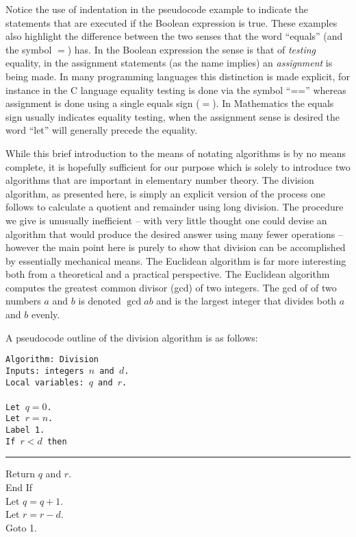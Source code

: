 Notice the use of indentation in the pseudocode example to indicate
the statements that are executed if the Boolean expression is true.
These examples also highlight the difference between the two senses 
that the word ``equals'' (and the symbol $=$) has.  In the Boolean
expression the sense is that of {\em testing} equality, in the
assignment statements (as the name implies) an {\em assignment} is
being made.  In many programming languages this distinction is made
explicit, for instance in the C language equality testing is done via
the symbol ``=='' whereas assignment is done using a single equals
sign ($=$).  In Mathematics the equals sign usually indicates equality
testing, when the assignment sense is desired the word ``let'' will
generally precede the equality.

While this brief introduction to the means of notating algorithms is by no
means complete, it is hopefully sufficient for our purpose which is
solely to introduce two algorithms that are important in elementary
number theory.  The  division algorithm, 
as presented here, is simply
an explicit version of the process one follows to calculate a quotient
and remainder using long division.  The procedure we give is unusually
inefficient -- with very little thought one could devise an algorithm
that would produce the desired answer using many fewer operations --
however the main point here is purely to show that division can be
accomplished by essentially mechanical means.  The Euclidean algorithm
is far more interesting both from a theoretical and a practical
perspective.  The Euclidean algorithm computes the greatest common
divisor (gcd) of two integers.  The gcd of of two numbers $a$ and $b$
is denoted $\gcd{a}{b}$ and is the largest integer that divides both
$a$ and $b$ evenly.   

A pseudocode outline of the division algorithm is as follows:
\medskip

\begin{center}
\begin{minipage}[b]{.5\textwidth}
\tt Algorithm: Division\\
Inputs: integers $n$ and $d$.\\
Local variables: $q$ and $r$.\\
\\
Let $q = 0$. \\
Let $r = n$. \\
Label 1.\\
If $r < d$ then\\
\rule{15pt}{0pt} Return $q$ and $r$.\\
End If\\
Let $q = q + 1$.\\
Let $r = r - d$.\\
Goto 1. \\
\end{minipage}
\end{center}


